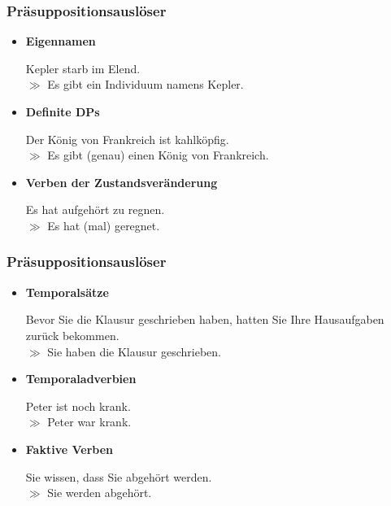 
\begin{frame}
\frametitle{Präsuppositionsauslöser}

\begin{itemize}
	\item \textbf{Eigennamen}
	
	\ea Kepler starb im Elend. \\ $\gg$ Es gibt ein Individuum namens Kepler.
	\z

	\item \textbf{Definite DPs}
	
	\ea Der König von Frankreich ist kahlköpfig.\\ 
	$\gg$ Es gibt (genau) einen König von Frankreich.
	\z
	
	\item \textbf{Verben der Zustandsveränderung}

	\ea Es hat aufgehört zu regnen.\\
			$\gg$ Es hat (mal) geregnet.
	\z

\end{itemize}

\end{frame}



\begin{frame}
\frametitle{Präsuppositionsauslöser}

\begin{itemize}
	\item \textbf{Temporalsätze}
	
	\ea Bevor Sie die Klausur geschrieben haben, hatten Sie Ihre Hausaufgaben zurück bekommen.\\
		$\gg$ Sie haben die Klausur geschrieben.
	\z

	\item \textbf{Temporaladverbien}
	
	\ea Peter ist noch krank.\\
		$\gg$ Peter war krank.
	\z
	
	\item \textbf{Faktive Verben}
	
		\ea Sie wissen, dass Sie abgehört werden.\\
		$\gg$ Sie werden abgehört.
		\z
	
\end{itemize}

\end{frame}


